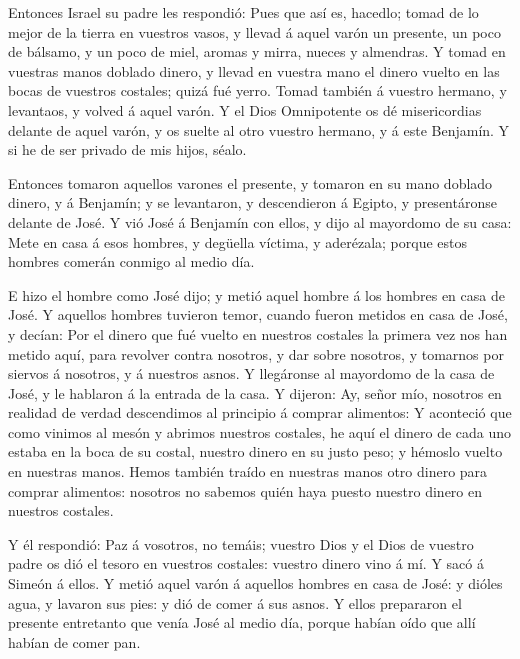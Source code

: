  Entonces Israel su padre les respondió: Pues que así es,
hacedlo; tomad de lo mejor de la tierra en vuestros vasos, y llevad á
aquel varón un presente, un poco de bálsamo, y un poco de miel, aromas y
mirra, nueces y almendras.  Y tomad en vuestras manos
doblado dinero, y llevad en vuestra mano el dinero vuelto en las bocas
de vuestros costales; quizá fué yerro.  Tomad también á
vuestro hermano, y levantaos, y volved á aquel varón.  Y el
Dios Omnipotente os dé misericordias delante de aquel varón, y os suelte
al otro vuestro hermano, y á este Benjamín. Y si he de ser privado de
mis hijos, séalo.

 Entonces tomaron aquellos varones el presente, y tomaron
en su mano doblado dinero, y á Benjamín; y se levantaron, y descendieron
á Egipto, y presentáronse delante de José.  Y vió José á
Benjamín con ellos, y dijo al mayordomo de su casa: Mete en casa á esos
hombres, y degüella víctima, y aderézala; porque estos hombres comerán
conmigo al medio día.

 E hizo el hombre como José dijo; y metió aquel hombre á
los hombres en casa de José.  Y aquellos hombres tuvieron
temor, cuando fueron metidos en casa de José, y decían: Por el dinero
que fué vuelto en nuestros costales la primera vez nos han metido aquí,
para revolver contra nosotros, y dar sobre nosotros, y tomarnos por
siervos á nosotros, y á nuestros asnos.  Y llegáronse al
mayordomo de la casa de José, y le hablaron á la entrada de la casa.
 Y dijeron: Ay, señor mío, nosotros en realidad de verdad
descendimos al principio á comprar alimentos:  Y aconteció
que como vinimos al mesón y abrimos nuestros costales, he aquí el dinero
de cada uno estaba en la boca de su costal, nuestro dinero en su justo
peso; y hémoslo vuelto en nuestras manos.  Hemos también
traído en nuestras manos otro dinero para comprar alimentos: nosotros no
sabemos quién haya puesto nuestro dinero en nuestros costales.

 Y él respondió: Paz á vosotros, no temáis; vuestro Dios y
el Dios de vuestro padre os dió el tesoro en vuestros costales: vuestro
dinero vino á mí. Y sacó á Simeón á ellos.  Y metió aquel
varón á aquellos hombres en casa de José: y dióles agua, y lavaron sus
pies: y dió de comer á sus asnos.  Y ellos prepararon el
presente entretanto que venía José al medio día, porque habían oído que
allí habían de comer pan.

